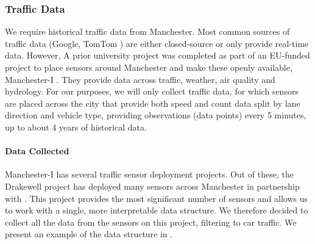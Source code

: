 \subsubsection{Traffic Data}
We require historical traffic data from Manchester. Most common sources of traffic data (Google, TomTom \cite{tomtom}) are either closed-source or only provide real-time data. However, A prior university project was completed as part of an EU-funded project to place sensors around Manchester and make these openly available, Manchester-I \cite{noauthor_manchester-i_nodate}. They provide data across traffic, weather, air quality and hydrology. For our purposes, we will only collect traffic data, for which sensors are placed across the city that provide both speed and count data split by lane direction and vehicle type, providing observations (data points) every 5 minutes, up to about 4 years of historical data.

\paragraph{Data Collected} Manchester-I has several traffic sensor deployment projects. Out of these, the Drakewell project has deployed many sensors across Manchester in partnership with  \cite{noauthor_bee_nodate}. This project provides the most significant number of sensors and allows us to work with a single, more interpretable data structure. We therefore decided to collect all the data from the sensors on this project, filtering to car traffic. We present an example of the data structure in .

\begin{table}[!ht]
    \centering
    \caption{Example traffic data record stored in InfluxDB.}
    \label{table:traffic_influx}
\end{table}



